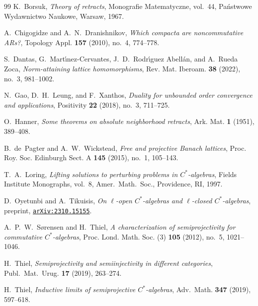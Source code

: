 \documentclass[11pt]{amsart}
\numberwithin{equation}{section}
\theoremstyle{definition}
\theoremstyle{remark}
\theoremstyle{plain}
\begin{document}
\begin{thebibliography}{99}
K.~Borsuk,
\emph{Theory of retracts},
Monografie Matematyczne, vol.~44,
Pa\'nstwowe Wydawnictwo Naukowe, Warsaw, 1967.

A.~Chigogidze and A.~N.~Dranishnikov,
\emph{Which compacta are noncommutative {AR}s?},
Topology Appl. \textbf{157} (2010), no.~4, 774--778.

S.~Dantas, G.~Mart\'{\i}nez-Cervantes, J.~D.~Rodr\'{\i}guez Abell\'an,
and A.~Rueda Zoca,
\emph{Norm-attaining lattice homomorphisms},
Rev. Mat. Iberoam. \textbf{38} (2022), no.~3, 981--1002.

N.~Gao, D.~H.~Leung, and F.~Xanthos,
\emph{Duality for unbounded order convergence and applications},
Positivity \textbf{22} (2018), no.~3, 711--725.


O.~Hanner,
\emph{Some theorems on absolute neighborhood retracts},
Ark. Mat. \textbf{1} (1951), 389--408.

B.~de~Pagter and A.~W.~Wickstead,
\emph{Free and projective {B}anach lattices},
Proc. Roy. Soc. Edinburgh Sect. A \textbf{145} (2015), no.~1, 105--143.

T.~A.~Loring,
\emph{Lifting solutions to perturbing problems in $C^*$-algebras},
Fields Institute Monographs, vol.~8,
Amer.\ Math.\ Soc., Providence, RI, 1997.

D.~Oyetunbi and A.~Tikuisis,
\emph{On $\ell$-open $C^*$-algebras and $\ell$-closed $C^*$-algebras},
preprint, \href{https://arxiv.org/abs/2310.15155}{\texttt{arXiv:2310.15155}}.

A.~P.~W.~S\o rensen and H.~Thiel,
\emph{A characterization of semiprojectivity for commutative $C^*$-algebras},
Proc. Lond. Math. Soc. (3) \textbf{105} (2012), no.~5, 1021--1046.

H.~Thiel,
\emph{Semiprojectivity and semiinjectivity in different categories},
Publ.\ Mat.\ Urug. \textbf{17} (2019), 263--274.

H.~Thiel,
\emph{Inductive limits of semiprojective $C^*$-algebras},
Adv.\ Math. \textbf{347} (2019), 597--618.

\end{thebibliography}
\end{document}
